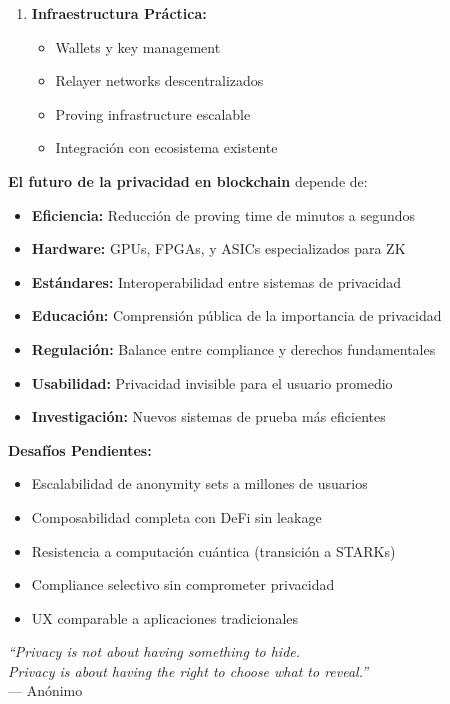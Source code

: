 \documentclass[11pt,a4paper,twoside]{book}
\theoremstyle{definition}
\theoremstyle{remark}
\begin{document}
\begin{keyidea}
\begin{enumerate}
    \item \textbf{Infraestructura Práctica:} 
    \begin{itemize}
        \item Wallets y key management
        \item Relayer networks descentralizados
        \item Proving infrastructure escalable
        \item Integración con ecosistema existente
    \end{itemize}
\end{enumerate}

\textbf{El futuro de la privacidad en blockchain} depende de:
\begin{itemize}
    \item \textbf{Eficiencia:} Reducción de proving time de minutos a segundos
    \item \textbf{Hardware:} GPUs, FPGAs, y ASICs especializados para ZK
    \item \textbf{Estándares:} Interoperabilidad entre sistemas de privacidad
    \item \textbf{Educación:} Comprensión pública de la importancia de privacidad
    \item \textbf{Regulación:} Balance entre compliance y derechos fundamentales
    \item \textbf{Usabilidad:} Privacidad invisible para el usuario promedio
    \item \textbf{Investigación:} Nuevos sistemas de prueba más eficientes
\end{itemize}

\textbf{Desafíos Pendientes:}
\begin{itemize}
    \item Escalabilidad de anonymity sets a millones de usuarios
    \item Composabilidad completa con DeFi sin leakage
    \item Resistencia a computación cuántica (transición a STARKs)
    \item Compliance selectivo sin comprometer privacidad
    \item UX comparable a aplicaciones tradicionales
\end{itemize}

\vspace{0.5cm}
\begin{center}
\textit{``Privacy is not about having something to hide.}\\
\textit{Privacy is about having the right to choose what to reveal.''}\\
--- Anónimo
\end{center}


\end{keyidea}
\end{document}
